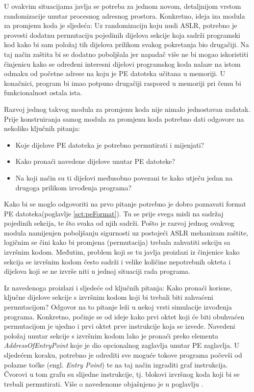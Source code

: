 \documentclass[times, utf8, diplomski, numeric]{fer}
\begin{document}
U ovakvim situacijama javlja se potreba za jednom novom,
detaljnijom vrstom randomizacije unutar procesnog adresnog
prostora. Konkretno, ideja iza modula za promjenu koda je
sljedeća: Uz randomizaciju koju nudi ASLR, potrebno je provesti
dodatnu permutaciju pojedinih dijelova sekcije koja sadrži
programski kod kako bi sam položaj tih dijelova prilikom svakog
pokretanja bio drugačiji. Na taj način zaštita bi se dodatno
poboljšala jer napadač više ne bi mogao iskoristiti činjenicu
kako se određeni interesni dijelovi programskog koda nalaze na
istom odmaku od početne adrese na koju je PE datoteka učitana u
memoriji. U konačnici, program bi imao potpuno drugačiji raspored
u memoriji pri čemu bi funkcionalnost ostala ista.

Razvoj jednog takvog modula za promjenu koda nije nimalo
jednostavan zadatak. Prije konstruiranja samog modula za promjenu
koda potrebno dati odgovore na nekoliko ključnih pitanja:

\begin{itemize}
\item Koje dijelove PE datoteka je potrebno permutirati i mijenjati?
\item Kako pronaći navedene dijelove unutar PE datoteke?
\item Na koji način su ti dijelovi međusobno povezani te kako utječu jedan na drugoga prilikom izvođenja programa?
\end{itemize}

Kako bi se moglo odgovoriti na prvo pitanje potrebno je dobro
poznavati format PE datoteka(poglavlje \ref{sct:peFormat}). Tu se
prije svega misli na sadržaj pojedinih sekcija, te što svaka od
njih sadrži. Pošto je razvoj jednog ovakvog modula namijenjen
poboljšanju sigurnosti uz postojeći ASLR mehanizam zaštite,
logičnim se čini kako bi promjena (permutacija) trebala zahvatiti
sekciju sa izvršnim kodom. Međutim, problem koji se tu javlja
proizlazi iz činjenice kako sekcija se izvršnim kodom često
sadrži i velike količine nepotrebnih okteta i dijelova koji se ne
izvrše niti u jednoj situaciji rada programa. 

Iz navedenoga proizlazi i sljedeće od ključnih pitanja: Kako
pronaći korisne, ključne dijelove sekcije s izvršnim kodom koji
bi trebali biti zahvaćeni permutacijom? Odgovor na to pitanje
leži u nekoj vrsti simulacije izvođenja programa. Konkretno,
počinje se od ideje kako prvi oktet koji će biti obuhvaćen
permutacijom je ujedno i prvi oktet prve instrukcije koja se
izvede. Navedeni položaj unutar sekcije s izvršnim kodom lako je
pronaći preko elementa \emph{AddressOfEntryPoint} koje je dio
opcionalnog zaglavlja unutar PE zaglavlja. U sljedećem koraku,
potrebno je odrediti sve moguće tokove programa počevši od
polazne točke (engl. \emph{Entry Point}) te na taj način
izgraditi graf instrukcija. Čvorovi u tom grafu su slijedne
instrukcije, tj. blokovi izvršnog koda koji bi se trebali
permutirati. Više o navedenome objašnjeno je u poglavlju
\label{sct:instrucionGraph}.
\end{document}
